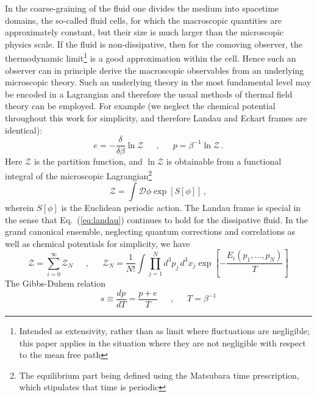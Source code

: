 \documentclass[12pt,onecolumn,showpacs,amssymb,aps,nofootinbib,floatfix]{revtex4-2}
\renewcommand{\eqref}[1]{Eq.~(\ref{#1})}
\newcommand{\eqcomma}{\phantom{AA},\phantom{AA}}
\newcommand{\lnz}{\ln \mathcal{Z}}
\begin{document}
	In the coarse-graining of the fluid one divides the medium into spacetime domains, the so-called fluid cells, for which the macroscopic quantities are approximately constant, but their size is much larger than the microscopic physics scale. If the fluid is non-dissipative, then for the comoving observer, the thermodynamic limit\footnote{Intended as extensivity, rather than as limit where fluctuations are negligible; this paper applies in the situation where they are not negligible with respect to the mean free path} is a good approximation within the cell. Hence such an observer can in principle derive the macroscopic observables from an underlying microscopic theory. Such an underlying theory in the most fundamental level may be encoded in a Lagrangian and therefore the usual methods of thermal field theory can be employed. For example (we neglect the chemical potential throughout this work for simplicity, and therefore Landau and Eckart frames are identical):
	\begin{equation}
		\label{micro}
		e=-\frac{\delta}{\delta \beta}\lnz \eqcomma p=\beta^{-1}\lnz\,. 
	\end{equation}
	Here $\mathcal{Z}$ is the partition function, and $\lnz$ is obtainable from a functional integral of the microscopic Lagrangian\footnote{The equilibrium part being defined using the Matsubara time prescription, which stipulates that time is periodic}~\cite{gale,huang}
	\begin{equation}
		\label{lnzeq}
		\mathcal{Z} = \int \mathcal{D}\phi \exp[S[\phi]]\,,
	\end{equation}
	wherein $S[\phi]$ is the Euclidean periodic action. The Landau frame is special in the sense that \eqref{eq:landau} continues to hold for the dissipative fluid.
	In the grand canonical ensemble, neglecting quantum corrections and correlations as well as chemical potentials for simplicity, we have %
	\begin{equation}
		\label{cluster}
		\mathcal{Z}= \sum_{i=0}^\infty  \mathcal{Z}_N \eqcomma \mathcal{Z}_N = \frac{1}{N!} \int \prod_{j=1}^N d^3p_j \, d^3 x_j \exp\left[ -\frac{E_i(p_1,...,p_N)}{T}  \right] 
	\end{equation}
	The Gibbs-Duhem relation
	\begin{equation}
		s\equiv \frac{dp}{dT}=\frac{p+e}{T} \eqcomma T=\beta^{-1} 
	\end{equation} 
\end{document}
